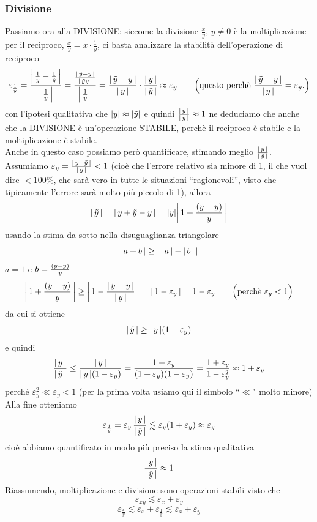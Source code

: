 \documentclass[12pt]{article}
\DeclarePairedDelimiter{\abs}{\lvert}{\rvert}
\begin{document}
\subsubsection{Divisione}
Passiamo ora alla DIVISIONE: siccome la divisione $\frac{x}{y}, \, y \ne 0$ è la moltiplicazione per il reciproco, $\frac{x}{y} = x \cdot \frac{1}{y}$, ci basta analizzare la stabilità dell'operazione di reciproco
\[ \varepsilon_{\frac{1}{y}} = \frac{\abs*{\,\frac{1}{y} - \frac{1}{\Tilde{y}}\,} }{\abs*{\,\frac{1}{y}\,}} = \frac{\frac{\abs*{\,\Tilde{y} - y\,}}{\abs*{\,\Tilde{y}y\,}}}{\abs*{\,\frac{1}{y}\,}} = \frac{\abs*{\,\Tilde{y} - y\,}}{\abs*{\,y\,}} \cdot \frac{\abs*{\,y\,}}{\abs*{\,\Tilde{y}\,}} \approx \varepsilon_y \qquad \Bigl( \text{questo perchè } \frac{\abs*{\,\Tilde{y} - y\,}}{\abs*{\,y\,}} = \varepsilon_y . \Bigr)\]
con l’ipotesi qualitativa che $\abs{y} \approx \abs{\Tilde{y}}$ e quindi $\frac{\abs*{\,y\,}}{\abs*{\,\Tilde{y}\,}} \approx 1$ ne deduciamo che anche che la DIVISIONE è un’operazione STABILE, perchè il reciproco è stabile e la moltiplicazione è stabile.\\
Anche in questo caso possiamo però quantificare, stimando meglio $\frac{\abs*{\,y\,}}{\abs*{\,\Tilde{y}\,}}$.\\ 
Assumiamo $\varepsilon_y = \frac{\abs*{\,y - \Tilde{y}\,}}{\abs*{\,y\,}} < 1$ (cioè che l’errore relativo sia minore di 1, il che vuol dire $< 100\%$, che sarà vero in tutte le situazioni “ragionevoli”, visto che tipicamente l’errore sarà molto più piccolo di 1), allora 
\[ \abs{\,\Tilde{y}\,} = \abs{\,y + \Tilde{y} - y\,} = \abs{y}\abs*{\,1 + \frac{(\Tilde{y} - y)}{y}\,}\]
usando la stima da sotto nella disuguaglianza triangolare 
\[\abs{\, a + b\,} \ge \abs{\,\abs{\,a\,} - \abs{\,b\,}\,}\]
$a = 1$ e $b = \frac{(\Tilde{y} - y)}{y}$
\[\abs*{\,1 + \frac{(\Tilde{y} - y)}{y}\,} \ge \abs*{\,1 - \frac{\abs*{\,\Tilde{y} - y\,}}{\abs{\,y\,}}\,} = \abs*{\,1 - \varepsilon_y\,} = 1 - \varepsilon_y \qquad \Bigl( \text{perchè } \varepsilon_y < 1 \Bigr)\]
da cui si ottiene 
\[\abs{\,\Tilde{y}\,} \ge \abs{\,y\,}(1 - \varepsilon_y)\]
e quindi
\[\frac{\abs*{\,y\,}}{\abs*{\,\Tilde{y}\,}} \le \frac{\abs*{\,y\,}}{\abs{\,y\,}(1 - \varepsilon_y)} = \frac{1 + \varepsilon_y}{(1 + \varepsilon_y)(1 - \varepsilon_y)} = \frac{1 + \varepsilon_y}{1 - \varepsilon_y^2} \approx 1 + \varepsilon_y\]
perché $\varepsilon_y^2 \ll \varepsilon_y < 1$ (per la prima volta usiamo qui il simbolo ``$\ll$" molto minore) \\
Alla fine otteniamo
\[\varepsilon_{\frac{1}{y}} = \varepsilon_y\,\frac{\abs{\,y\,}}{\abs{\,\Tilde{y}\,}} \lesssim \varepsilon_y (1 + \varepsilon_y) \approx \varepsilon_y\]
cioè abbiamo quantificato in modo più preciso la stima qualitativa 
\[\frac{\abs*{\,y\,}}{\abs*{\,\Tilde{y}\,}} \approx 1\]
Riassumendo, moltiplicazione e divisione sono operazioni stabili visto che 
\[\varepsilon_{xy} \lesssim \varepsilon_x + \varepsilon_y\]
\[\varepsilon_{\frac{x}{y}} \lesssim \varepsilon_x + \varepsilon_{\frac{1}{y}} \lesssim  \varepsilon_x + \varepsilon_y\]
\end{document}
